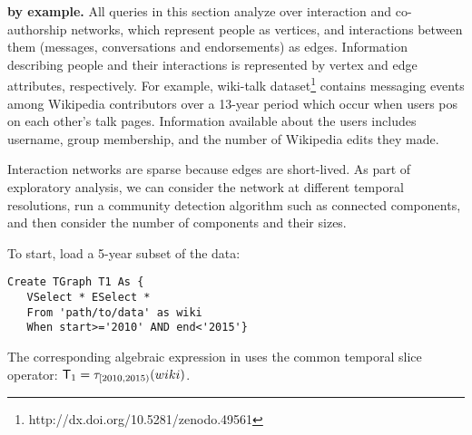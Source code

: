 {\bf \ql by example.}  All queries in this section analyze over
interaction and co-authorship networks, which represent people as
vertices, and interactions between them (messages, conversations and
endorsements) as edges.  Information describing people and their
interactions is represented by vertex and edge attributes,
respectively. For example, wiki-talk
dataset\footnote{http://dx.doi.org/10.5281/zenodo.49561} contains
messaging events among Wikipedia contributors over a 13-year period
which occur when users pos on each other's talk pages.  Information
available about the users includes username, group membership, and the
number of Wikipedia edits they made.

Interaction networks are sparse because edges are short-lived.  As
part of exploratory analysis, we can consider the network at different
temporal resolutions, run a community detection algorithm such as
connected components, and then consider the number of
components and their sizes.




\begin{example}
\vspace{-0.1cm}
\label{ex:slice}
To start, load a 5-year subset of the data:
\begin{small}
\begin{verbatim}
Create TGraph T1 As {
   VSelect * ESelect *  
   From 'path/to/data' as wiki
   When start>='2010' AND end<'2015'}
\end{verbatim}
\vspace{-0.1cm}
\end{small}

The corresponding algebraic expression in \tga uses the common
temporal slice operator: $\mathsf{T}_1 = \tau_{[2010, 2015)}(wiki)$.

\vspace{-0.1cm}
\end{example}

